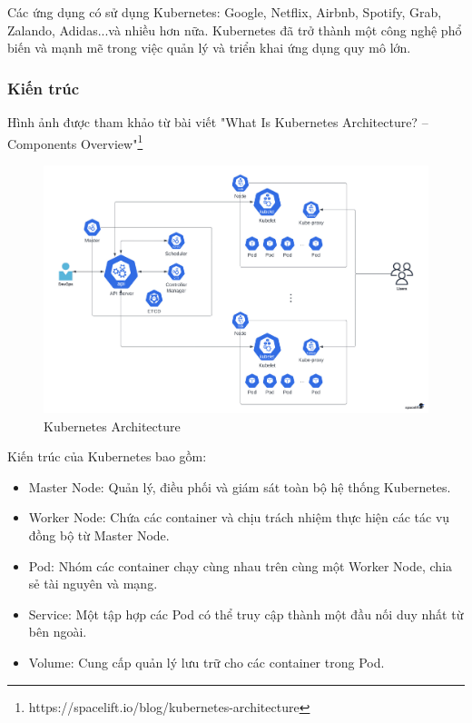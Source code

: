 \indent Các ứng dụng có sử dụng Kubernetes: Google, Netflix, Airbnb, Spotify, Grab, Zalando, Adidas...và nhiều hơn nữa. Kubernetes đã trở thành một công nghệ phổ biến và mạnh mẽ trong việc quản lý và triển khai ứng dụng quy mô lớn.
\subsubsection{Kiến trúc}
Hình ảnh được tham khảo từ bài viết "What Is Kubernetes Architecture? – Components Overview"\footnote{https://spacelift.io/blog/kubernetes-architecture}
 \begin{figure}[H]
    \begin{center}
    \includegraphics[scale = 0.2]{images/phat/kubernetes_architecture.jpg}
    \vspace*{7mm}
    \caption{Kubernetes Architecture }
    \end{center}
    \label{}
\end{figure}
\indent Kiến trúc của Kubernetes bao gồm:
\begin{itemize}
    \item Master Node: Quản lý, điều phối và giám sát toàn bộ hệ thống Kubernetes.
    \item Worker Node: Chứa các container và chịu trách nhiệm thực hiện các tác vụ đồng bộ từ Master Node.
    \item Pod: Nhóm các container chạy cùng nhau trên cùng một Worker Node, chia sẻ tài nguyên và mạng.
    \item Service: Một tập hợp các Pod có thể truy cập thành một đầu nối duy nhất từ bên ngoài.
    \item Volume: Cung cấp quản lý lưu trữ cho các container trong Pod.
\end{itemize}
